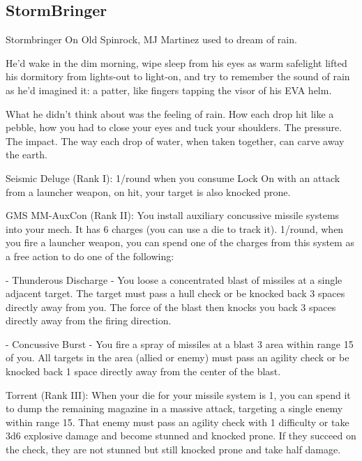 \subsection{StormBringer}

                                                Stormbringer
On Old Spinrock, MJ Martinez used to dream of rain.

He’d wake in the dim morning, wipe sleep from his eyes as warm safelight lifted his dormitory
from lights-out to light-on, and try to remember the sound of rain as he’d imagined it: a patter, like
fingers tapping the visor of his EVA helm.

What he didn’t think about was the feeling of rain. How each drop hit like a pebble, how you had
to close your eyes and tuck your shoulders. The pressure. The impact.
The way each drop of water, when taken together, can carve away the earth.

Seismic Deluge (Rank I): 1/round when you consume Lock On with an attack from a launcher
weapon, on hit, your target is also knocked prone.

GMS MM-AuxCon (Rank II): You install auxiliary concussive missile systems into your mech. It
has 6 charges (you can use a die to track it). 1/round, when you fire a launcher weapon, you can
spend one of the charges from this system as a free action to do one of the following:

             -    Thunderous Discharge - You loose a concentrated blast of missiles at a single
                  adjacent target. The target must pass a hull check or be knocked back 3 spaces
                  directly away from you. The force of the blast then knocks you back 3 spaces
                  directly away from the firing direction.

             -    Concussive Burst - You fire a spray of missiles at a blast 3 area within range 15 of
                  you. All targets in the area (allied or enemy) must pass an agility check or be
                  knocked back 1 space directly away from the center of the blast.

Torrent (Rank III): When your die for your missile system is 1, you can spend it to dump the
remaining magazine in a massive attack, targeting a single enemy within range 15. That enemy
must pass an agility check with 1 difficulty or take 3d6 explosive damage and become stunned
and knocked prone. If they succeed on the check, they are not stunned but still knocked prone
and take half damage.

